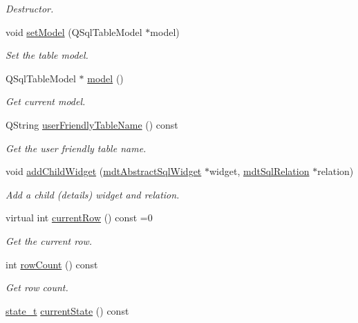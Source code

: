 \begin{DoxyCompactItemize}
\begin{DoxyCompactList}\small\item\em Destructor. \end{DoxyCompactList}\item 
void \hyperlink{classmdt_abstract_sql_widget_a8971862741e1ef79c79e11b37e955476}{setModel} (QSqlTableModel $\ast$model)
\begin{DoxyCompactList}\small\item\em Set the table model. \end{DoxyCompactList}\item 
QSqlTableModel $\ast$ \hyperlink{classmdt_abstract_sql_widget_a298d40a6540aeabbb7644e3c4fd9f3ea}{model} ()
\begin{DoxyCompactList}\small\item\em Get current model. \end{DoxyCompactList}\item 
QString \hyperlink{classmdt_abstract_sql_widget_a8207edaf31a7d988db5b86a4099ad4eb}{userFriendlyTableName} () const 
\begin{DoxyCompactList}\small\item\em Get the user friendly table name. \end{DoxyCompactList}\item 
void \hyperlink{classmdt_abstract_sql_widget_a7225af05f3b10e82db939f0ec0996167}{addChildWidget} (\hyperlink{classmdt_abstract_sql_widget}{mdtAbstractSqlWidget} $\ast$widget, \hyperlink{classmdt_sql_relation}{mdtSqlRelation} $\ast$relation)
\begin{DoxyCompactList}\small\item\em Add a child (details) widget and relation. \end{DoxyCompactList}\item 
virtual int \hyperlink{classmdt_abstract_sql_widget_ab48f6375f55f1eaba309fb17aaaf5770}{currentRow} () const =0
\begin{DoxyCompactList}\small\item\em Get the current row. \end{DoxyCompactList}\item 
int \hyperlink{classmdt_abstract_sql_widget_a5e25e4a2e0dc56c06c530c9b543366f2}{rowCount} () const 
\begin{DoxyCompactList}\small\item\em Get row count. \end{DoxyCompactList}\item 
\hypertarget{classmdt_abstract_sql_widget_a786eb7b7b111eef748002419984be7d9}{
\hyperlink{classmdt_abstract_sql_widget_a54e6a7f2b41fb3edfa1e4ed62abf4072}{state\_\-t} \hyperlink{classmdt_abstract_sql_widget_a786eb7b7b111eef748002419984be7d9}{currentState} () const }
\label{classmdt_abstract_sql_widget_a786eb7b7b111eef748002419984be7d9}


\end{DoxyCompactItemize}
